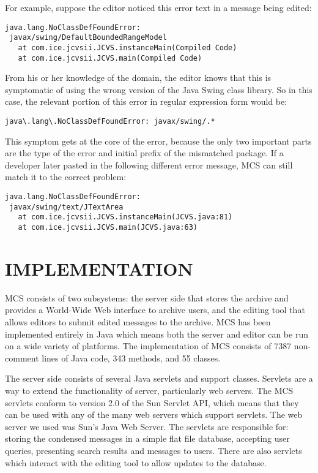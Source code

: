 For example, suppose the editor noticed this error text in a message being
edited:

{\scriptsize
\begin{verbatim}
java.lang.NoClassDefFoundError:
 javax/swing/DefaultBoundedRangeModel
   at com.ice.jcvsii.JCVS.instanceMain(Compiled Code)
   at com.ice.jcvsii.JCVS.main(Compiled Code)
\end{verbatim}}

From his or her knowledge of the domain, the editor knows that this is
symptomatic of using the wrong version of the Java Swing class library. So in
this case, the relevant portion of this error in regular expression form would
be:

{\scriptsize
\begin{verbatim}
java\.lang\.NoClassDefFoundError: javax/swing/.*
\end{verbatim}}

This symptom gets at the core of the error, because the only two important
parts are the type of the error and initial prefix of the mismatched package.
If a developer later pasted in the following different error message, MCS can
still match it to the correct problem:

{\scriptsize
\begin{verbatim}
java.lang.NoClassDefFoundError:
 javax/swing/text/JTextArea
   at com.ice.jcvsii.JCVS.instanceMain(JCVS.java:81)
   at com.ice.jcvsii.JCVS.main(JCVS.java:63)
\end{verbatim}}

\section{IMPLEMENTATION}
\label{sec:implementation}
MCS consists of two subsystems: the server side that stores the archive and
provides a World-Wide Web interface to archive users, and the editing tool that
allows editors to submit edited messages to the archive. MCS has been
implemented entirely in Java which means both the server and editor can be run
on a wide variety of platforms. The implementation of MCS consists of 7387
non-comment lines of Java code, 343 methods, and 55 classes.

The server side consists of several Java servlets and support classes. Servlets
are a way to extend the functionality of server, particularly web servers. The
MCS servlets conform to version 2.0 of the Sun Servlet API, which means that
they can be used with any of the many web servers which support servlets. The
web server we used was Sun's Java Web Server. The servlets are responsible for:
storing the condensed messages in a simple flat file database, accepting user
queries, presenting search results and messages to users. There are also
servlets which interact with the editing tool to allow updates to the database.

